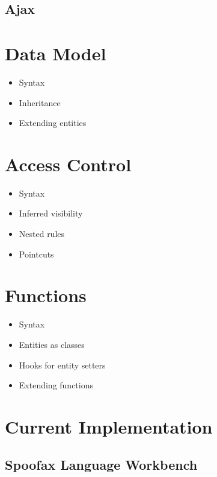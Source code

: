     \subsection{\label{subsec:ajax}Ajax}

  \section{\label{sec:data-model}Data Model}

    \begin{itemize}
      \item Syntax
      \item Inheritance
      \item Extending entities
    \end{itemize}

  \section{\label{sec:access-control}Access Control}

    \begin{itemize}
      \item Syntax
      \item Inferred visibility
      \item Nested rules
      \item Pointcuts
    \end{itemize}

  \section{\label{sec:functions}Functions}

    \begin{itemize}
      \item Syntax
      \item Entities as classes
      \item Hooks for entity setters
      \item Extending functions
    \end{itemize}

  \section{\label{sec:current-implementation}Current Implementation}

    \subsection{\label{subsec:spoofax}Spoofax Language Workbench}


